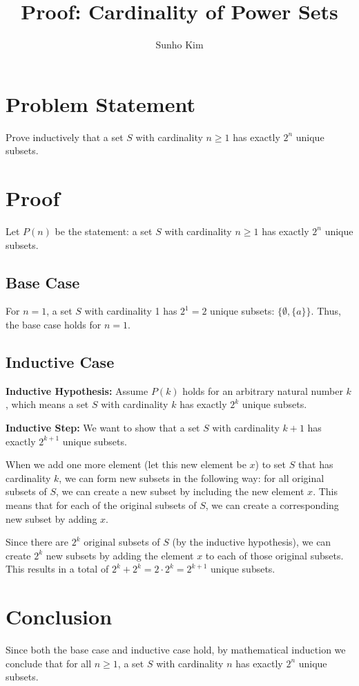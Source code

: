 \documentclass{article}
\title{Proof: Cardinality of Power Sets}
\author{Sunho Kim}
\date{}
\begin{document}
\maketitle

\section{Problem Statement}
Prove inductively that a set $S$ with cardinality $n \geq 1$ has exactly $2^n$ unique subsets.

\section{Proof}

Let $P(n)$ be the statement: a set $S$ with cardinality $n \geq 1$ has exactly $2^n$ unique subsets.

\subsection{Base Case}
For $n = 1$, a set $S$ with cardinality 1 has $2^1 = 2$ unique subsets: $\{\emptyset, \{a\}\}$. Thus, the base case holds for $n = 1$.

\subsection{Inductive Case}
\textbf{Inductive Hypothesis:} Assume $P(k)$ holds for an arbitrary natural number $k$, which means a set $S$ with cardinality $k$ has exactly $2^k$ unique subsets.

\textbf{Inductive Step:} We want to show that a set $S$ with cardinality $k+1$ has exactly $2^{k+1}$ unique subsets.

When we add one more element (let this new element be $x$) to set $S$ that has cardinality $k$, we can form new subsets in the following way: for all original subsets of $S$, we can create a new subset by including the new element $x$. This means that for each of the original subsets of $S$, we can create a corresponding new subset by adding $x$.

Since there are $2^k$ original subsets of $S$ (by the inductive hypothesis), we can create $2^k$ new subsets by adding the element $x$ to each of those original subsets. This results in a total of $2^k + 2^k = 2 \cdot 2^k = 2^{k+1}$ unique subsets.

\section{Conclusion}
Since both the base case and inductive case hold, by mathematical induction we conclude that for all $n \geq 1$, a set $S$ with cardinality $n$ has exactly $2^n$ unique subsets.
\end{document}
